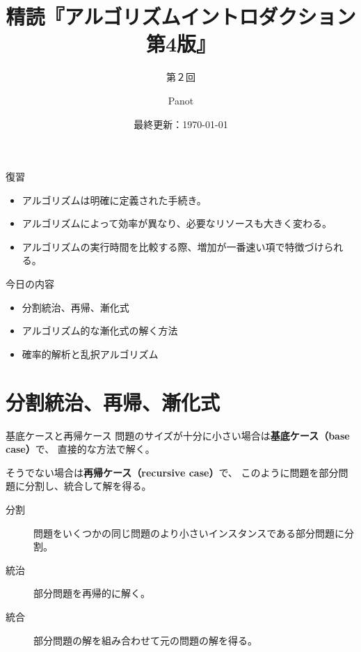 \documentclass[unicode,11pt,aspectratio=169,notes]{beamer} %
\title{精読『アルゴリズムイントロダクション 第4版』}
\subtitle{第２回}
\author{Panot}
\date{最終更新：\today}
\begin{document}
\begin{frame}
  \titlepage{}
\end{frame}

\begin{frame}{復習}
  \begin{itemize}
    \item アルゴリズムは明確に定義された手続き。
    \item アルゴリズムによって効率が異なり、必要なリソースも大きく変わる。
    \item アルゴリズムの実行時間を比較する際、増加が一番速い項で特徴づけられる。
  \end{itemize}
\end{frame}

\begin{frame}{今日の内容}
  \begin{itemize}
    \item 分割統治、再帰、漸化式
    \item アルゴリズム的な漸化式の解く方法
    \item 確率的解析と乱択アルゴリズム
  \end{itemize}
\end{frame}

\section*{分割統治、再帰、漸化式}

\begin{frame}
  \sectionpage{}
\end{frame}

\begin{frame}{基底ケースと再帰ケース}
  問題のサイズが十分に小さい場合は\textbf{基底ケース（base case）}で、
  直接的な方法で解く。

  そうでない場合は\textbf{再帰ケース（recursive case）}で、
  このように問題を部分問題に分割し、統合して解を得る。
  \begin{description}
    \item[分割] 問題をいくつかの同じ問題のより小さいインスタンスである部分問題に分割。
    \item[統治] 部分問題を再帰的に解く。
    \item[統合] 部分問題の解を組み合わせて元の問題の解を得る。
  \end{description}
\end{frame}
\end{document}

